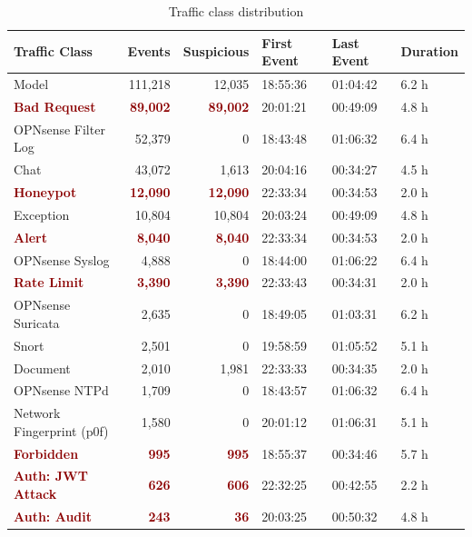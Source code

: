 \begin{table}[hbtp]
\caption{Traffic class distribution}
\label{tab:export_22Dec2025_010633_traffic_class}
\centering
\scriptsize
\begin{tabular}{|l|r|r|l|l|l|}
\hline
\textbf{Traffic Class} & \textbf{Events} & \textbf{Suspicious} & \textbf{First Event} & \textbf{Last Event} & \textbf{Duration} \\
\hline
Model & 111,218 & 12,035 & 18:55:36 & 01:04:42 & 6.2 h \\
\textcolor{darkred}{\textbf{Bad Request}} & \textcolor{darkred}{\textbf{89,002}} & \textcolor{darkred}{\textbf{89,002}} & 20:01:21 & 00:49:09 & 4.8 h \\
OPNsense Filter Log & 52,379 & 0 & 18:43:48 & 01:06:32 & 6.4 h \\
Chat & 43,072 & 1,613 & 20:04:16 & 00:34:27 & 4.5 h \\
\textcolor{darkred}{\textbf{Honeypot}} & \textcolor{darkred}{\textbf{12,090}} & \textcolor{darkred}{\textbf{12,090}} & 22:33:34 & 00:34:53 & 2.0 h \\
Exception & 10,804 & 10,804 & 20:03:24 & 00:49:09 & 4.8 h \\
\textcolor{darkred}{\textbf{Alert}} & \textcolor{darkred}{\textbf{8,040}} & \textcolor{darkred}{\textbf{8,040}} & 22:33:34 & 00:34:53 & 2.0 h \\
OPNsense Syslog & 4,888 & 0 & 18:44:00 & 01:06:22 & 6.4 h \\
\textcolor{darkred}{\textbf{Rate Limit}} & \textcolor{darkred}{\textbf{3,390}} & \textcolor{darkred}{\textbf{3,390}} & 22:33:43 & 00:34:31 & 2.0 h \\
OPNsense Suricata & 2,635 & 0 & 18:49:05 & 01:03:31 & 6.2 h \\
Snort & 2,501 & 0 & 19:58:59 & 01:05:52 & 5.1 h \\
Document & 2,010 & 1,981 & 22:33:33 & 00:34:35 & 2.0 h \\
OPNsense NTPd & 1,709 & 0 & 18:43:57 & 01:06:32 & 6.4 h \\
Network Fingerprint (p0f) & 1,580 & 0 & 20:01:12 & 01:06:31 & 5.1 h \\
\textcolor{darkred}{\textbf{Forbidden}} & \textcolor{darkred}{\textbf{995}} & \textcolor{darkred}{\textbf{995}} & 18:55:37 & 00:34:46 & 5.7 h \\
\textcolor{darkred}{\textbf{Auth: JWT Attack}} & \textcolor{darkred}{\textbf{626}} & \textcolor{darkred}{\textbf{606}} & 22:32:25 & 00:42:55 & 2.2 h \\
\textcolor{darkred}{\textbf{Auth: Audit}} & \textcolor{darkred}{\textbf{243}} & \textcolor{darkred}{\textbf{36}} & 20:03:25 & 00:50:32 & 4.8 h \\

\end{tabular}
\end{table}
